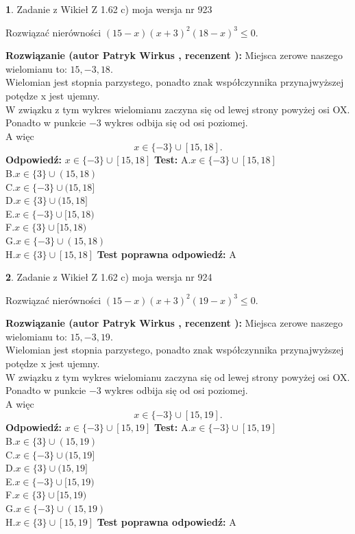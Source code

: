 \documentclass[12pt, a4paper]{article}
\theoremstyle{definition} %
\newtheorem{zad}{}
\newcommand{\zadStart}[1]{\begin{zad}#1\newline}
\newcommand{\zadStop}{\end{zad}}
\newcommand{\rozwStart}[2]{\noindent \textbf{Rozwiązanie (autor #1 , recenzent #2): }\newline}
\newcommand{\rozwStop}{\newline}
\newcommand{\odpStart}{\noindent \textbf{Odpowiedź:}\newline}
\newcommand{\odpStop}{\newline}
\newcommand{\testStart}{\noindent \textbf{Test:}\newline}
\newcommand{\testStop}{\newline}
\newcommand{\kluczStart}{\noindent \textbf{Test poprawna odpowiedź:}\newline}
\newcommand{\kluczStop}{\newline}
\begin{document}
\zadStart{Zadanie z Wikieł Z 1.62 c) moja wersja nr 923}

Rozwiązać nierówności $(15-x)(x+3)^{2}(18-x)^{3}\le0$.
\zadStop
\rozwStart{Patryk Wirkus}{}
Miejsca zerowe naszego wielomianu to: $15, -3, 18$.\\
Wielomian jest stopnia parzystego, ponadto znak współczynnika przy\linebreak najwyższej potędze x jest ujemny.\\ W związku z tym wykres wielomianu zaczyna się od lewej strony powyżej osi OX.\\
Ponadto w punkcie $-3$ wykres odbija się od osi poziomej.\\
A więc $$x \in \{-3\} \cup [15,18].$$
\rozwStop
\odpStart
$x \in \{-3\} \cup [15,18]$
\odpStop
\testStart
A.$x \in \{-3\} \cup [15,18]$\\
B.$x \in \{3\} \cup (15,18)$\\
C.$x \in \{-3\} \cup (15,18]$\\
D.$x \in \{3\} \cup (15,18]$\\
E.$x \in \{-3\} \cup [15,18)$\\
F.$x \in \{3\} \cup [15,18)$\\
G.$x \in \{-3\} \cup (15,18)$\\
H.$x \in \{3\} \cup [15,18]$
\testStop
\kluczStart
A
\kluczStop



\zadStart{Zadanie z Wikieł Z 1.62 c) moja wersja nr 924}

Rozwiązać nierówności $(15-x)(x+3)^{2}(19-x)^{3}\le0$.
\zadStop
\rozwStart{Patryk Wirkus}{}
Miejsca zerowe naszego wielomianu to: $15, -3, 19$.\\
Wielomian jest stopnia parzystego, ponadto znak współczynnika przy\linebreak najwyższej potędze x jest ujemny.\\ W związku z tym wykres wielomianu zaczyna się od lewej strony powyżej osi OX.\\
Ponadto w punkcie $-3$ wykres odbija się od osi poziomej.\\
A więc $$x \in \{-3\} \cup [15,19].$$
\rozwStop
\odpStart
$x \in \{-3\} \cup [15,19]$
\odpStop
\testStart
A.$x \in \{-3\} \cup [15,19]$\\
B.$x \in \{3\} \cup (15,19)$\\
C.$x \in \{-3\} \cup (15,19]$\\
D.$x \in \{3\} \cup (15,19]$\\
E.$x \in \{-3\} \cup [15,19)$\\
F.$x \in \{3\} \cup [15,19)$\\
G.$x \in \{-3\} \cup (15,19)$\\
H.$x \in \{3\} \cup [15,19]$
\testStop
\kluczStart
A
\kluczStop
\end{document}
